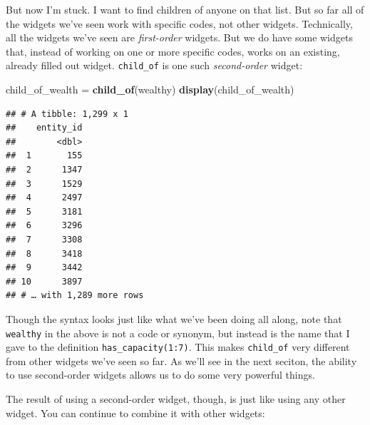 \documentclass[]{book}
\newenvironment{Shaded}{\begin{snugshade}}{\end{snugshade}}
\newcommand{\CommentTok}[1]{\textcolor[rgb]{0.56,0.35,0.01}{\textit{#1}}}
\newcommand{\DecValTok}[1]{\textcolor[rgb]{0.00,0.00,0.81}{#1}}
\newcommand{\KeywordTok}[1]{\textcolor[rgb]{0.13,0.29,0.53}{\textbf{#1}}}
\newcommand{\NormalTok}[1]{#1}
\newcommand{\OperatorTok}[1]{\textcolor[rgb]{0.81,0.36,0.00}{\textbf{#1}}}
\newcommand{\StringTok}[1]{\textcolor[rgb]{0.31,0.60,0.02}{#1}}
\begin{document}
\begin{Shaded}
\end{Shaded}

But now I'm stuck. I want to find children of anyone on that list. But so far all of the widgets we've seen work with specific codes, not other widgets. Technically, all the widgets we've seen are \emph{first-order} widgets. But we do have some widgets that, instead of working on one or more specific codes, works on an existing, already filled out widget. \texttt{child\_of} is one such \emph{second-order} widget:

\begin{Shaded}
\begin{Highlighting}[]
\NormalTok{child_of_wealth =}\StringTok{ }\KeywordTok{child_of}\NormalTok{(wealthy)}
\KeywordTok{display}\NormalTok{(child_of_wealth)}
\end{Highlighting}
\end{Shaded}

\begin{verbatim}
## # A tibble: 1,299 x 1
##    entity_id
##        <dbl>
##  1       155
##  2      1347
##  3      1529
##  4      2497
##  5      3181
##  6      3296
##  7      3308
##  8      3418
##  9      3442
## 10      3897
## # … with 1,289 more rows
\end{verbatim}

Though the syntax looks just like what we've been doing all along, note that \texttt{wealthy} in the above is not a code or synonym, but instead is the name that I gave to the definition \texttt{has\_capacity(1:7)}. This makes \texttt{child\_of} very different from other widgets we've seen so far. As we'll see in the next seciton, the ability to use second-order widgets allows us to do some very powerful things.

The result of using a second-order widget, though, is just like using any other widget. You can continue to combine it with other widgets:

\begin{Shaded}
\end{Shaded}
\end{document}
